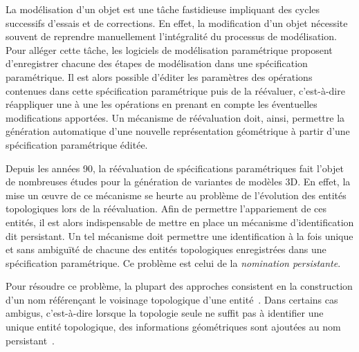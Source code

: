 La modélisation d'un objet est une tâche fastidieuse impliquant des cycles
successifs d'essais et de corrections. %
En effet, la modification d'un objet nécessite souvent de reprendre manuellement
l'intégralité du processus de modélisation. %
Pour alléger cette tâche, les logiciels de modélisation paramétrique proposent
d'enregistrer chacune des étapes de modélisation dans une spécification
paramétrique. %
Il est alors possible d'éditer les paramètres des opérations contenues dans
cette spécification paramétrique puis de la réévaluer, c'est-à-dire réappliquer
une à une les opérations en prenant en compte les éventuelles modifications
apportées. %
Un mécanisme de réévaluation doit, ainsi, permettre la génération automatique
d'une nouvelle représentation géométrique à partir d'une spécification
paramétrique éditée. %

Depuis les années 90, la réévaluation de spécifications paramétriques fait
l'objet de nombreuses études pour la génération de variantes de modèles 3D. %
En effet, la mise un \oe uvre de ce mécanisme se heurte au problème de
l'évolution des entités topologiques lors de la réévaluation. %
Afin de permettre l'appariement de ces entités, il est alors indispensable de
mettre en place un mécanisme d'identification dit persistant. %
Un tel mécanisme doit permettre une identification à la fois unique et sans
ambiguïté de chacune des entités topologiques enregistrées dans une
spécification paramétrique. %
Ce problème est celui de la \emph{nomination persistante}. %

Pour résoudre ce problème, la plupart des approches consistent en la
construction d'un nom référençant le voisinage topologique d'une
entité~\cite{chen1995representation, kripac1995mechanism, CAPOYLEAS199617,
	agbodan2000persistent}. %
Dans certains cas ambigus, c'est-à-dire lorsque la topologie seule ne suffit pas
à identifier une unique entité topologique, des informations géométriques sont
ajoutées au nom
persistant~\cite{wu2001face,bidarra2005feature,wang2005geometry}. %

